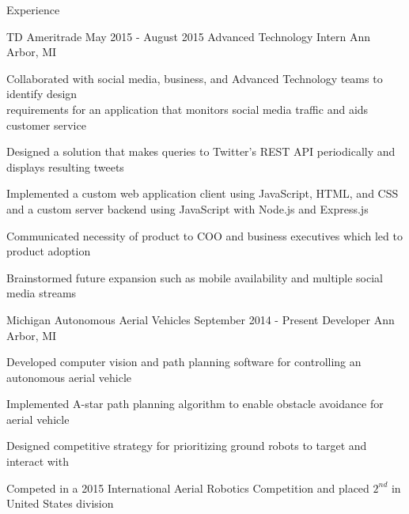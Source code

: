 \documentclass{resume}
\begin{document}
\begin{rSection}{Experience}

\begin{rSubsection}{TD Ameritrade}
                   {May 2015 - August 2015}
                   {Advanced Technology Intern}
                   {Ann Arbor, MI}
    \item Collaborated with social media, business, and Advanced Technology
          teams to identify design \\ requirements for an application that
          monitors social media traffic and aids customer service
    \item Designed a solution that makes queries to Twitter's REST API
          periodically and displays resulting tweets
    \item Implemented a custom web application client using JavaScript, HTML,
          and CSS and a custom server backend using JavaScript with Node.js and
          Express.js
    \item Communicated necessity of product to COO and business executives which
          led to product adoption 
    \item Brainstormed future expansion such as mobile availability and multiple
          social media streams
\end{rSubsection}


\begin{rSubsection}{Michigan Autonomous Aerial Vehicles}
                   {September 2014 - Present}
                   {Developer}
                   {Ann Arbor, MI}
    \item Developed computer vision and path planning software for controlling
          an autonomous aerial vehicle
    \item Implemented A-star path planning algorithm to enable obstacle
          avoidance for aerial vehicle
    \item Designed competitive strategy for prioritizing ground robots to target
          and interact with
    \item Competed in a 2015 International Aerial Robotics Competition and
          placed $2^{nd}$ in United States division
\end{rSubsection}



\end{rSection}
\end{document}
